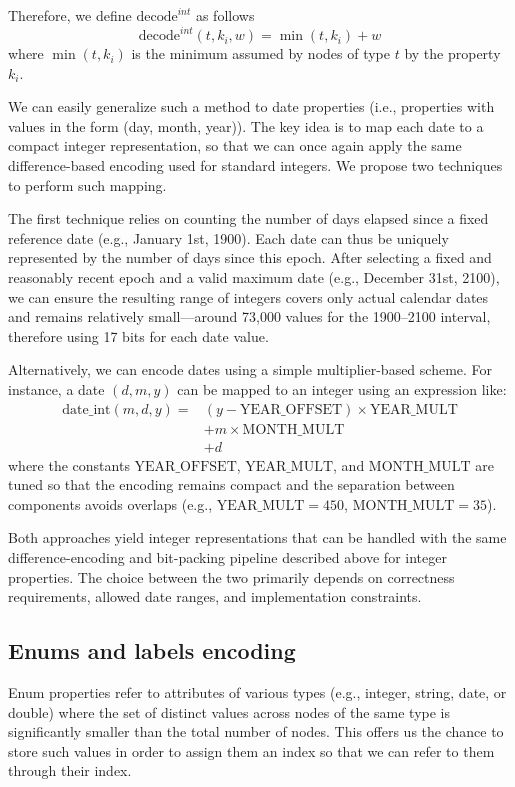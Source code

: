 Therefore, we define $\mathrm{decode}^{int}$ as follows
\begin{equation*}
    \mathrm{decode}^{int}(t, k_i, w) = \min (t, k_i) + w
\end{equation*}
where $\min(t, k_i)$ is the minimum assumed by nodes of type $t$ by the property $k_i$.

We can easily generalize such a method to date properties (i.e., properties with values in the form (day, month, year)). The key idea is to map each date to a compact integer representation, so that we can once again apply the same difference-based encoding used for standard integers. We propose two techniques to perform such mapping.

The first technique relies on counting the number of days elapsed since a fixed reference date (e.g., January 1st, 1900). Each date can thus be uniquely represented by the number of days since this epoch. After selecting a fixed and reasonably recent epoch and a valid maximum date (e.g., December 31st, 2100), we can ensure the resulting range of integers covers only actual calendar dates and remains relatively small—around 73,000 values for the 1900–2100 interval, therefore using 17 bits for each date value.

Alternatively, we can encode dates using a simple multiplier-based scheme. For instance, a date $(d, m, y)$ can be mapped to an integer using an expression like:
\begin{align*}
\mathrm{date\_int}(m, d, y) ={} & (y - \mathrm{YEAR\_OFFSET}) \times \mathrm{YEAR\_MULT} \\
     & + m \times \mathrm{MONTH\_MULT} \\
     & + d
\end{align*}
where the constants \(\mathrm{YEAR\_OFFSET}\), \(\mathrm{YEAR\_MULT}\), and \(\mathrm{MONTH\_MULT}\) are tuned so that the encoding remains compact and the separation between components avoids overlaps (e.g., \(\mathrm{YEAR\_MULT} = 450\), \(\mathrm{MONTH\_MULT} = 35\)).

Both approaches yield integer representations that can be handled with the same difference-encoding and bit-packing pipeline described above for integer properties. The choice between the two primarily depends on correctness requirements, allowed date ranges, and implementation constraints.

\subsection{Enums and labels encoding}
Enum properties refer to attributes of various types (e.g., integer, string, date, or double) where the set of distinct values across nodes of the same type is significantly smaller than the total number of nodes. This offers us the chance to store such values in order to assign them an index so that we can refer to them through their index.

